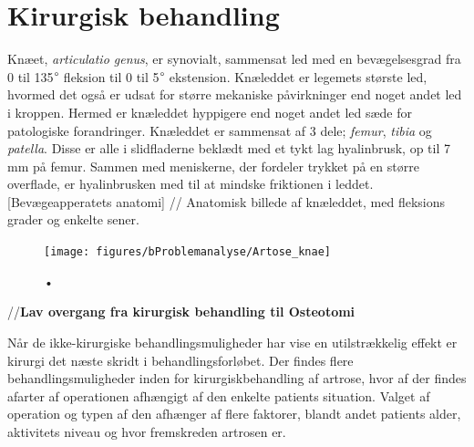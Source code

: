 \section{Kirurgisk behandling}

Knæet, \textit{articulatio genus}, er synovialt, sammensat led med en bevægelsesgrad fra 0 til 135$\degree$ fleksion til 0 til 5$\degree$ ekstension. Knæleddet er legemets største led, hvormed det også er udsat for større mekaniske påvirkninger end noget andet led i kroppen. Hermed er knæleddet hyppigere end noget andet led sæde for patologiske forandringer. Knæleddet er sammensat af 3 dele; \textit{femur}, \textit{tibia} og \textit{patella}. Disse er alle i slidfladerne beklædt med et tykt lag hyalinbrusk, op til 7 mm på femur. Sammen med meniskerne, der fordeler trykket på en større overflade, er hyalinbrusken med til at mindske friktionen i leddet. [Bevægeapperatets anatomi]
//
Anatomisk billede af knæleddet, med fleksions grader og enkelte sener.

\begin{figure}[H] 
\begin{center}
\texttt{[image: figures/bProblemanalyse/Artose\_knae]}
\end{center}
\caption{•} 
\label{fig:tka_implant} 
\end{figure}


//\textbf{Lav overgang fra kirurgisk behandling til Osteotomi}
%

Når de ikke-kirurgiske behandlingsmuligheder har vise en utilstrækkelig effekt er kirurgi det næste skridt i behandlingsforløbet. Der findes flere behandlingsmuligheder inden for kirurgiskbehandling af artrose, hvor af der findes afarter af operationen afhængigt af den enkelte patients situation. Valget af operation og typen af den afhænger af flere faktorer, blandt andet patients alder, aktivitets niveau og hvor fremskreden artrosen er.

